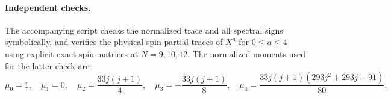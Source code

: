 \documentclass{article}
\begin{document}
\paragraph{Independent checks.}
The accompanying script checks the normalized trace and all spectral signs
symbolically, and verifies the physical-spin partial traces of $X^a$
for $0\le a\le4$ using explicit exact spin matrices at $N=9,10,12$.
The normalized moments used for the latter check are
\[
\mu_0=1,\quad\mu_1=0,\quad
\mu_2=\frac{33j(j+1)}4,\quad
\mu_3=-\frac{33j(j+1)}8,\quad
\mu_4=\frac{33j(j+1)(293j^2+293j-91)}{80}.
\]
\end{document}
